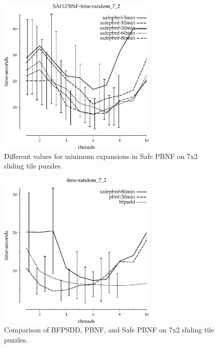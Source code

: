 \documentclass{article}
\begin{document}
\begin{figure}[h!]
\includegraphics[width=3in]{../graphs/tiles_random_7_2/SAFEPBNF-time-random_7_2.eps}
\caption{Different values for minimum expansions in Safe PBNF on 7x2 sliding tile puzzles.}
\end{figure}

\begin{figure}[h!]
\includegraphics[width=3in]{../graphs/tiles_random_7_2/time-random_7_2.eps}
\caption{Comparison of BFPSDD, PBNF, and Safe PBNF on 7x2 sliding tile puzzles.}
\end{figure}
\end{document}
